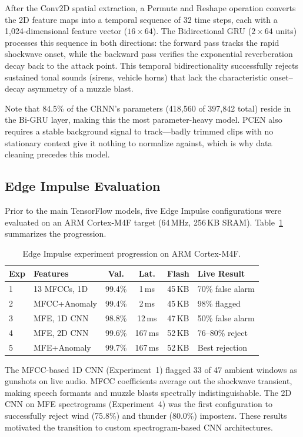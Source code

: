 \documentclass[conference]{IEEEtran}
\begin{document}
After the Conv2D spatial extraction, a Permute and Reshape operation converts the 2D feature maps into a temporal sequence of 32 time steps, each with a 1{,}024-dimensional feature vector ($16 \times 64$). The Bidirectional GRU ($2 \times 64$ units) processes this sequence in both directions: the forward pass tracks the rapid shockwave onset, while the backward pass verifies the exponential reverberation decay back to the attack point. This temporal bidirectionality successfully rejects sustained tonal sounds (sirens, vehicle horns) that lack the characteristic onset--decay asymmetry of a muzzle blast.

Note that 84.5\% of the CRNN's parameters (418{,}560 of 397{,}842 total) reside in the Bi-GRU layer, making this the most parameter-heavy model. PCEN also requires a stable background signal to track---badly trimmed clips with no stationary context give it nothing to normalize against, which is why data cleaning precedes this model.

\subsection{Edge Impulse Evaluation}
Prior to the main TensorFlow models, five Edge Impulse configurations were evaluated on an ARM Cortex-M4F target (64\,MHz, 256\,KB SRAM). Table~\ref{tab:edgeimpulse} summarizes the progression.

\begin{table}[!t]
\centering
\caption{Edge Impulse experiment progression on ARM Cortex-M4F.}
\label{tab:edgeimpulse}
\footnotesize
\begin{tabular}{llcccl}
\toprule
\textbf{Exp} & \textbf{Features} & \textbf{Val.} & \textbf{Lat.} & \textbf{Flash} & \textbf{Live Result} \\
\midrule
1 & 13 MFCCs, 1D & 99.4\% & 1\,ms & 45\,KB & 70\% false alarm \\
2 & MFCC+Anomaly & 99.4\% & 2\,ms & 45\,KB & 98\% flagged \\
3 & MFE, 1D CNN & 98.8\% & 12\,ms & 47\,KB & 50\% false alarm \\
4 & MFE, 2D CNN & 99.6\% & 167\,ms & 52\,KB & 76--80\% reject \\
5 & MFE+Anomaly & 99.7\% & 167\,ms & 52\,KB & Best rejection \\
\bottomrule
\end{tabular}
\end{table}

The MFCC-based 1D CNN (Experiment~1) flagged 33 of 47 ambient windows as gunshots on live audio. MFCC coefficients average out the shockwave transient, making speech formants and muzzle blasts spectrally indistinguishable. The 2D CNN on MFE spectrograms (Experiment~4) was the first configuration to successfully reject wind (75.8\%) and thunder (80.0\%) imposters. These results motivated the transition to custom spectrogram-based CNN architectures.
\end{document}
